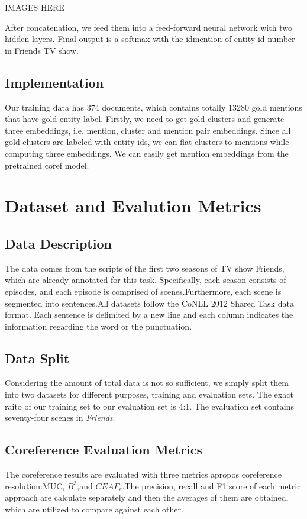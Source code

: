 \documentclass[11pt]{article}
\begin{document}
IMAGES HERE

After concatenation, we feed them into a feed-forward neural network with two hidden layers. Final output is a softmax with the idmention of entity id number in Friends TV show.

\subsection{Implementation}
Our training data has 374 documents, which contains totally 13280 gold mentions that have gold entity label. Firstly, we need to get gold clusters and generate three embeddings, i.e. mention, cluster and mention pair embeddings. Since all gold clusters are labeled with entity ids, we can flat clusters to mentions while computing three embeddings. We can easily get mention embeddings from the pretrained coref model.


\section{Dataset and Evalution Metrics}
\subsection{Data Description}
The data comes from the scripts of the first two seasons of TV show Friends, which are already annotated for this task. Specifically, each season consists of episodes, and each episode is comprised of scenes.Furthermore, each scene is segmented into sentences.All datasets follow the CoNLL 2012 Shared Task data format. Each sentence is delimited by a new line and each column indicates the information regarding the word or the punctuation.
\subsection{Data Split}
Considering the amount of total data is not so sufficient, we simply split them into two datasets for different purposes, training and evaluation sets. The exact raito of our training set to our evaluation set is 4:1. The evaluation set contains seventy-four scenes in \textit{Friends}.

\subsection{Coreference Evaluation Metrics}
The coreference results are evaluated with three metrics apropos coreference resolution:MUC, $B^{3}$,and $CEAF_e$.The precision, recall and F1 score of each metric approach are calculate separately and then the averages of them are obtained, which are utilized to compare against each other.
\end{document}
